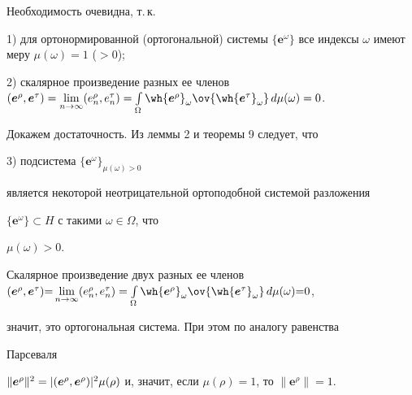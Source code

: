 \begin{pf}


Необходимость очевидна, т.\,к.





1) для ортонормированной (ортогональной) системы $\{\boldsymbol


e^\omega\}$ все индексы $\omega$ имеют меру $\mu(\omega)=1$ ($>0$);





2) скалярное произведение разных ее членов $(\boldsymbol


e^\rho,\boldsymbol e^\tau)=\lim\limits_{n\to\infty}(e^\rho_n,e^\tau_n


)=\int\limits_\Omega\wh{\boldsymbol e^\rho}_\omega\ov


{\wh{\boldsymbol e^\tau}_\omega}\,d\mu(\omega)=0$.





Докажем достаточность. Из леммы 2 и теоремы 9 следует, что





3) подсистема $\{\boldsymbol e^\omega\}_{\mu(\omega)>0}$


является некоторой неотрицательной ортоподобной системой разложения


$\{\boldsymbol e^\omega\}\subset H$ с такими $\omega\in\Omega$, что


$\mu(\omega)>0$.





Скалярное произведение двух разных ее членов $(


\boldsymbol e^\rho,\boldsymbol e^\tau){=}\lim\limits_{n\to\infty}


(e^\rho_n,e^\tau_n)=\int\limits_\Omega\wh{\boldsymbol e^\rho}_\omega


\ov{\wh{\boldsymbol e^\tau}_\omega}\,d\mu(\omega){=}0$,


значит, это ортогональная система. При этом по аналогу равенства


Парсеваля


$\|\boldsymbol e^\rho\|^2=\linebreak|(\boldsymbol e^\rho,\boldsymbol


e^\rho)|^2\mu(\rho)$ и, значит, если $\mu(\rho)=1$, то $\|\boldsymbol


e^\rho\|=1$.


\end{pf}





